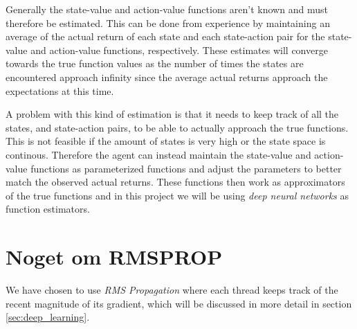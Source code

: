 \documentclass[11pt]{article}
\begin{document}
\maketitle

Generally the state-value and action-value functions aren't known and must therefore be
estimated.
This can be done from experience by maintaining an average of the actual return of each
state and each state-action pair for the state-value and action-value
functions, respectively.
These estimates will converge towards the true function values as the number of times
the states are encountered approach infinity since the average actual returns approach
the expectations at this time.

A problem with this kind of estimation is that it needs to keep track of all the states, and state-action
pairs, to be able to actually approach the true functions.
This is not feasible if the amount of states is very high or the state space is continous.
Therefore the agent can instead maintain the state-value and action-value functions as
parameterized functions and adjust the parameters to better match the observed actual returns\cite{RLbook}.
These functions then work as approximators of the true functions and in this project we will
be using \textit{deep neural networks} as function estimators.


\section{Noget om RMSPROP}

We have chosen to use \textit{RMS Propagation}\cite{RMSprop}
where each thread keeps track of the recent magnitude of its gradient,
which will be discussed in more detail in section \ref{sec:deep_learning}.
\end{document}
